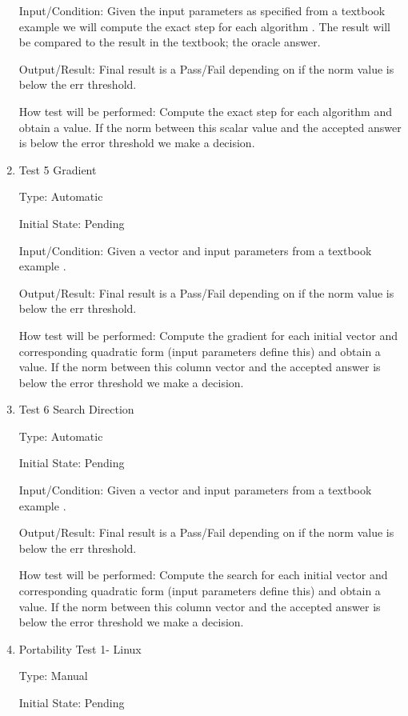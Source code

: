 \documentclass[12pt, titlepage]{article}
\begin{document}
\begin{enumerate}
Input/Condition: Given the input parameters as specified from a textbook example we will compute the exact step for each algorithm \citep{Boyd2006}. The result will be compared to the result in the textbook; the oracle answer. 
					
Output/Result: Final result is a Pass/Fail depending on if the norm value is below the err threshold.

How test will be performed: Compute the exact step for each algorithm and obtain a value. If the norm between this scalar value and the accepted answer is below the error threshold we make a decision.

\item{Test 5 Gradient}\

Type: Automatic
					
Initial State: Pending
					
Input/Condition: Given a vector and input parameters from a textbook example \citep{Boyd2006}.
					
Output/Result: Final result is a Pass/Fail depending on if the norm value is below the err threshold.

How test will be performed: Compute the gradient for each initial vector and corresponding quadratic form (input parameters define this) and obtain a value. If the norm between this column vector and the accepted answer is below the error threshold we make a decision.


\item{Test 6 Search Direction}\

Type: Automatic
					
Initial State: Pending
					
Input/Condition: Given a vector and input parameters from a textbook example \citep{Boyd2006}.
					
Output/Result: Final result is a Pass/Fail depending on if the norm value is below the err threshold.

How test will be performed: Compute the search for each initial vector and corresponding quadratic form (input parameters define this) and obtain a value. If the norm between this column vector and the accepted answer is below the error threshold we make a decision.

\item{Portability Test 1- Linux\\}

Type: Manual 
					
Initial State: Pending
					

\end{enumerate}
\end{document}
